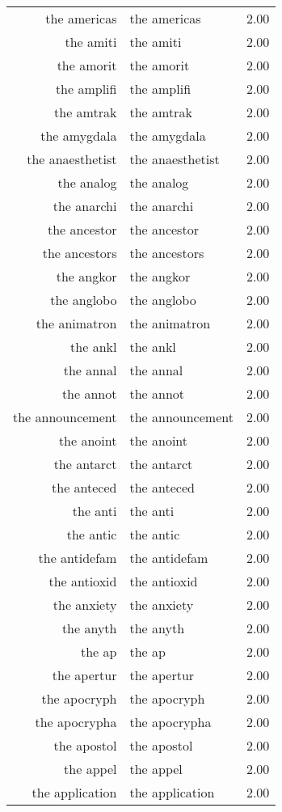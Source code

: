 \begin{table}[ht]
\begin{tabular}{rlr}
  the americas & the americas & 2.00 \\ 
  the amiti & the amiti & 2.00 \\ 
  the amorit & the amorit & 2.00 \\ 
  the amplifi & the amplifi & 2.00 \\ 
  the amtrak & the amtrak & 2.00 \\ 
  the amygdala & the amygdala & 2.00 \\ 
  the anaesthetist & the anaesthetist & 2.00 \\ 
  the analog & the analog & 2.00 \\ 
  the anarchi & the anarchi & 2.00 \\ 
  the ancestor & the ancestor & 2.00 \\ 
  the ancestors & the ancestors & 2.00 \\ 
  the angkor & the angkor & 2.00 \\ 
  the anglobo & the anglobo & 2.00 \\ 
  the animatron & the animatron & 2.00 \\ 
  the ankl & the ankl & 2.00 \\ 
  the annal & the annal & 2.00 \\ 
  the annot & the annot & 2.00 \\ 
  the announcement & the announcement & 2.00 \\ 
  the anoint & the anoint & 2.00 \\ 
  the antarct & the antarct & 2.00 \\ 
  the anteced & the anteced & 2.00 \\ 
  the anti & the anti & 2.00 \\ 
  the antic & the antic & 2.00 \\ 
  the antidefam & the antidefam & 2.00 \\ 
  the antioxid & the antioxid & 2.00 \\ 
  the anxiety & the anxiety & 2.00 \\ 
  the anyth & the anyth & 2.00 \\ 
  the ap & the ap & 2.00 \\ 
  the apertur & the apertur & 2.00 \\ 
  the apocryph & the apocryph & 2.00 \\ 
  the apocrypha & the apocrypha & 2.00 \\ 
  the apostol & the apostol & 2.00 \\ 
  the appel & the appel & 2.00 \\ 
  the application & the application & 2.00 \\ 

\end{tabular}
\end{table}
